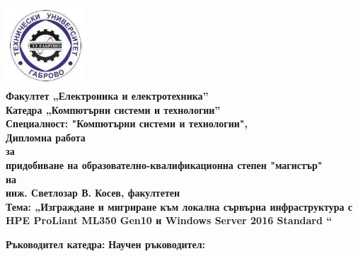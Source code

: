 \documentclass[11pt,a4paper]{article}
\begin{document}
	
	\title{}
	\date{\vspace{-18ex}}
	\maketitle
	
	\thispagestyle{titlepage}
	\begin{center}
		{\includegraphics[width=3cm]{images/logo.jpg}\\    
			\huge{\textbf{Факултет „Електроника и електротехника”}}\\
			\huge{\textbf{Катедра „Компютърни системи и технологии”}}\\
			\vspace*{0.5cm}
			\Large{\textbf{Специалност: "Компютърни системи и технологии",}}\\
			\vspace*{1.5cm}
			\Huge{\textbf{Дипломна работа}}\\
			\Large{\textbf{за}}\\
			\Large{\textbf{придобиване на образователно-квалификационна степен "магистър"}}\\
			\Large{\textbf{на}}\\
			\Large{\textbf{инж. Светлозар В. Косев, факултетен }}\\
			\vspace*{0.7cm}
			\huge{\textbf{Тема: „Изграждане и мигриране към локална сървърна инфраструктура с HPE ProLiant ML350 Gen10 и Windows Server 2016 Standard “}}\\
			\vspace*{1cm}
			\begin{flushleft}                
				\large{\textbf{Ръководител катедра:}}\hspace{3cm} \large{\textbf{Научен ръководител:}}
			\end{flushleft}    
}
\end{center}
\end{document}
